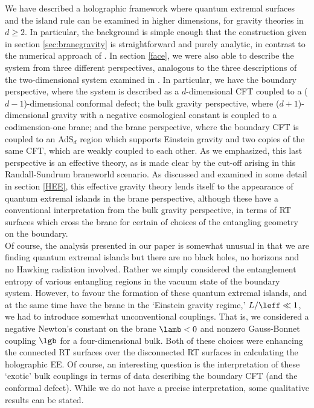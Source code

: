 %

We have described a holographic framework where quantum extremal surfaces and the island rule  can be examined in higher dimensions, \ie for gravity theories in $d\ge2$. In particular, the background is simple enough that the construction given in section \ref{sec:branegravity} is straightforward and purely analytic, in contrast to the numerical approach of \cite{Almheiri:2019psy}. In section \ref{face}, we were also able to describe the system from three different perspectives, analogous to the three descriptions of the two-dimensional system examined in \cite{Almheiri:2019hni}. In particular, we have the boundary perspective, where the system is described as a $d$-dimensional CFT coupled to a ($d-1$)-dimensional conformal defect;
the bulk gravity perspective, where ($d+1$)-dimensional gravity with a negative cosmological constant is coupled to a codimension-one brane; and the brane perspective, where the boundary CFT is coupled to an AdS$_d$ region which supports Einstein gravity and two copies of the same CFT, which are weakly coupled to each other. As we emphasized, this last perspective is an effective theory, as is made clear by the cut-off arising in this Randall-Sundrum braneworld scenario. As discussed and examined in some detail in section \ref{HEE}, this effective gravity theory lends itself to the appearance of quantum extremal islands in the brane perspective, although these have a conventional interpretation from the bulk gravity perspective, in terms of RT surfaces which cross the brane for certain of choices of the entangling geometry on the boundary.\\

 Of course, the analysis presented in our paper is somewhat unusual in that we are finding quantum extremal islands but there are no black holes, no horizons and no Hawking radiation involved. Rather we simply considered the entanglement entropy of various entangling regions in the vacuum state of the boundary system. However, to favour the formation of these quantum extremal islands, and at the same time have the brane in the `Einstein gravity regime,' \ie $L/\leff\ll1$, we had to introduce somewhat unconventional couplings. That is, we considered a negative Newton's constant on the brane $\lamb<0$ and nonzero Gauss-Bonnet coupling $\lgb$ for a four-dimensional bulk. Both of these choices were enhancing the connected RT surfaces over the disconnected RT surfaces in calculating the holographic EE. Of course, an interesting question is the interpretation of these `exotic' bulk couplings in terms of data describing the boundary CFT (and the conformal defect). While we do not have a precise interpretation, some qualitative results can be stated.

